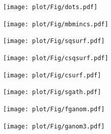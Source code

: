 \begin{frame}
  \begin{figure}
  \texttt{[image: plot/Fig/dots.pdf]}
  \end{figure}
\end{frame}

\begin{frame}
  \begin{figure}
  \texttt{[image: plot/Fig/mbmincs.pdf]}
  \end{figure}
\end{frame}

\begin{frame}
  \begin{figure}
  \texttt{[image: plot/Fig/sqsurf.pdf]}
  \end{figure}
\end{frame}

\begin{frame}
  \begin{figure}
  \texttt{[image: plot/Fig/csqsurf.pdf]}
  \end{figure}
\end{frame}

\begin{frame}
  \begin{figure}
  \texttt{[image: plot/Fig/csurf.pdf]}
  \end{figure}
\end{frame}

\begin{frame}
  \begin{figure}
  \texttt{[image: plot/Fig/sgath.pdf]}
  \end{figure}
\end{frame}

\begin{frame}
  \begin{figure}
  \texttt{[image: plot/Fig/fganom.pdf]}
  \end{figure}
\end{frame}

\begin{frame}
  \begin{figure}
  \texttt{[image: plot/Fig/ganom3.pdf]}
  \end{figure}
\end{frame}

